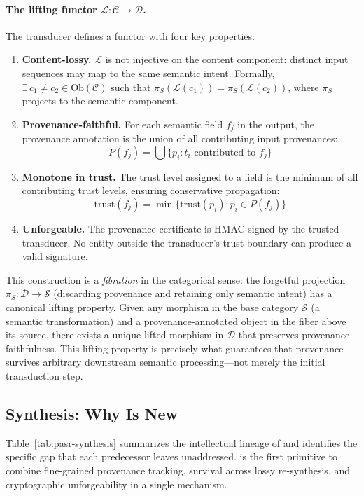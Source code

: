 \paragraph{The lifting functor $\mathcal{L}: \mathcal{C} \to \mathcal{D}$.}
The \pasr transducer defines a functor with four key properties:
\begin{enumerate}[leftmargin=*]
\item \textbf{Content-lossy.} $\mathcal{L}$ is not injective on the content
      component: distinct input sequences may map to the same semantic intent.
      Formally, $\exists\, c_1 \neq c_2 \in \text{Ob}(\mathcal{C})$ such that
      $\pi_S(\mathcal{L}(c_1)) = \pi_S(\mathcal{L}(c_2))$, where $\pi_S$
      projects to the semantic component.
\item \textbf{Provenance-faithful.} For each semantic field $f_j$ in the
      output, the provenance annotation is the union of all contributing
      input provenances:
      \[
        P(f_j) = \bigcup \{p_i : t_i \text{ contributed to } f_j\}
      \]
\item \textbf{Monotone in trust.} The trust level assigned to a field is the
      minimum of all contributing trust levels, ensuring conservative
      propagation:
      \[
        \text{trust}(f_j) = \min\{\text{trust}(p_i) : p_i \in P(f_j)\}
      \]
\item \textbf{Unforgeable.} The provenance certificate is HMAC-signed by the
      trusted transducer. No entity outside the transducer's trust boundary
      can produce a valid signature.
\end{enumerate}

\noindent
This construction is a \emph{fibration} in the categorical sense: the
forgetful projection $\pi_S: \mathcal{D} \to \mathcal{S}$ (discarding
provenance and retaining only semantic intent) has a canonical lifting
property. Given any morphism in the base category $\mathcal{S}$ (a semantic
transformation) and a provenance-annotated object in the fiber above its
source, there exists a unique lifted morphism in $\mathcal{D}$ that preserves
provenance faithfulness. This lifting property is precisely what guarantees
that provenance survives arbitrary downstream semantic processing---not merely
the initial transduction step.

\subsection{Synthesis: Why \pasr Is New}

Table~\ref{tab:pasr-synthesis} summarizes the intellectual lineage of \pasr
and identifies the specific gap that each predecessor leaves unaddressed.
\pasr is the first primitive to combine fine-grained provenance tracking,
survival across lossy re-synthesis, and cryptographic unforgeability in a
single mechanism.

